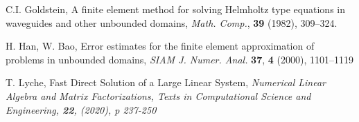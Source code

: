 \documentclass{article}
\theoremstyle{remark}
\begin{document}
\begin{thebibliography}{99}
  C.I. Goldstein, A finite element method for solving Helmholtz type equations in waveguides and other unbounded domains,
{\it Math. Comp.}, \textbf{39} (1982), 309–324.

  H. Han, W. Bao, Error estimates for the finite element approximation of problems in unbounded domains,
{\it SIAM J. Numer. Anal.} \textbf{37}, \textbf{4} (2000), 1101–1119

 T. Lyche, Fast Direct Solution of a Large Linear System,
\it{Numerical Linear Algebra and Matrix Factorizations, Texts in Computational Science and Engineering}, \textbf{22}, (2020), p 237-250 

\end{thebibliography}
\end{document}
